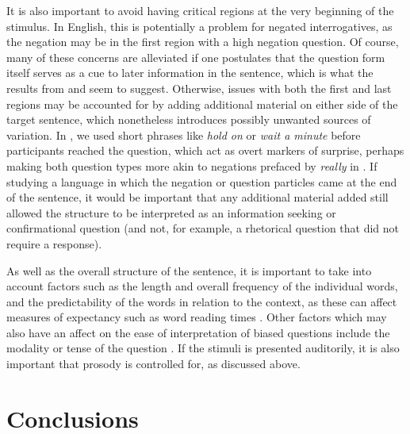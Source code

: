 \documentclass[output=paper,colorlinks,citecolor=brown]{langscibook}
\begin{document}
It is also important to avoid having critical regions at the very beginning of the stimulus. In English, this is potentially a problem for negated interrogatives, as the negation may be in the first region with a high negation question. Of course, many of these concerns are alleviated if one postulates that the question form itself serves as a cue to later information in the sentence, which is what the results from \citet{macuch_processing_inprep} and \citet{tian_representing_2021} seem to suggest. Otherwise, issues with both the first and last regions may be accounted for by adding additional material on either side of the target sentence, which nonetheless introduces possibly unwanted sources of variation. In \citet{macuch_processing_inprep}, we used short phrases like \textit{hold on} or \textit{wait a minute} before participants reached the question, which act as overt markers of surprise, perhaps making both question types more akin to negations prefaced by \textit{really} in \citet{domaneschi_bias_2017}. If studying a language in which the negation or question particles came at the end of the sentence, it would be important that any additional material added still allowed the structure to be interpreted as an information seeking or confirmational question (and not, for example, a rhetorical question that did not require a response).

As well as the overall structure of the sentence, it is important to take into account factors such as the length and overall frequency of the individual words, and the predictability of the words in relation to the context, as these can affect measures of expectancy such as word reading times \citep{Conklin2016}. Other factors which may also have an affect on the ease of interpretation of biased questions include the modality or tense of the question \citep{maro2021}. If the stimuli is presented auditorily, it is also important that prosody is controlled for, as discussed above.



\section{Conclusions}
\end{document}
